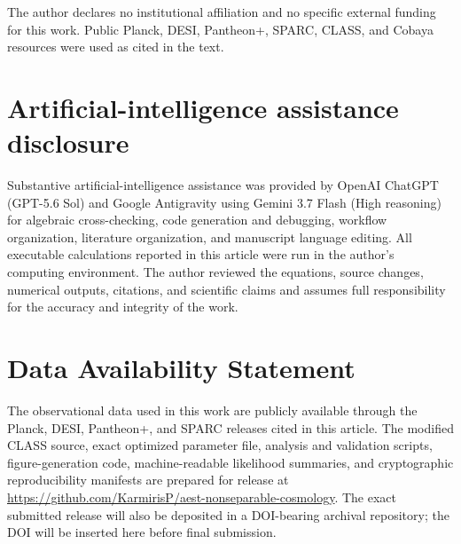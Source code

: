 \documentclass[aps,prd,twocolumn,superscriptaddress,nofootinbib,longbibliography,floatfix]{revtex4-2}
\begin{document}
\maketitle








\begin{acknowledgments}
The author declares no institutional affiliation and no specific external funding for this work. Public Planck, DESI, Pantheon+, SPARC, CLASS, and Cobaya resources were used as cited in the text.
\end{acknowledgments}

\section*{Artificial-intelligence assistance disclosure}
Substantive artificial-intelligence assistance was provided by OpenAI ChatGPT (GPT-5.6 Sol) and Google Antigravity using Gemini 3.7 Flash (High reasoning) for algebraic cross-checking, code generation and debugging, workflow organization, literature organization, and manuscript language editing. All executable calculations reported in this article were run in the author's computing environment. The author reviewed the equations, source changes, numerical outputs, citations, and scientific claims and assumes full responsibility for the accuracy and integrity of the work.

\section*{Data Availability Statement}
The observational data used in this work are publicly available through the Planck, DESI, Pantheon+, and SPARC releases cited in this article. The modified CLASS source, exact optimized parameter file, analysis and validation scripts, figure-generation code, machine-readable likelihood summaries, and cryptographic reproducibility manifests are prepared for release at \url{https://github.com/KarmirisP/aest-nonseparable-cosmology}. The exact submitted release will also be deposited in a DOI-bearing archival repository; the DOI will be inserted here before final submission.

\appendix












\end{document}
